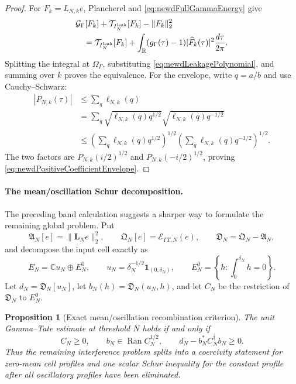 \documentclass[11pt]{amsart}
\newtheorem{proposition}[theorem]{Proposition}
\theoremstyle{definition}
\theoremstyle{remark}
\newcommand{\C}{\mathbb C}
\newcommand{\R}{\mathbb R}
\begin{document}
\begin{proof}
For $F_k=L_{N,k}e$, Plancherel and
\eqref{eq:newdFullGammaEnergy} give
\begin{align*}
 &\mathcal G_\Gamma[F_k]+\mathcal T_{I_N^{\rm leak}}[F_k]-\|F_k\|_2^2\\
 &\quad=\mathcal T_{I_N^{\rm leak}}[F_k]
 +\int_\R(g_\Gamma(\tau)-1)|\widehat F_k(\tau)|^2
          \frac{d\tau}{2\pi}.
\end{align*}
Splitting the integral at $\Omega_\Gamma$, substituting
\eqref{eq:newdLeakagePolynomial}, and summing over $k$ proves the
equivalence.  For the envelope, write $q=a/b$ and use Cauchy--Schwarz:
\begin{align*}
 |P_{N,k}(\tau)|
 &\leq\sum_q\ell_{N,k}(q)\\
 &=\sum_q
   \sqrt{\ell_{N,k}(q)q^{1/2}}
   \sqrt{\ell_{N,k}(q)q^{-1/2}}\\
 &\leq
 \left(\sum_q\ell_{N,k}(q)q^{1/2}\right)^{1/2}
 \left(\sum_q\ell_{N,k}(q)q^{-1/2}\right)^{1/2}.
\end{align*}
The two factors are $P_{N,k}(i/2)^{1/2}$ and
$P_{N,k}(-i/2)^{1/2}$, proving
\eqref{eq:newdPositiveCoefficientEnvelope}.
\end{proof}

\paragraph{The mean/oscillation Schur decomposition.}
The preceding band calculation suggests a sharper way to formulate the
remaining global problem.  Put
\[
 \mathfrak A_N[e]=\|\mathbf L_Ne\|_2^2,
 \qquad
 \mathfrak Q_N[e]=\mathcal E_{\Gamma T,N}(e),
 \qquad
 \mathfrak D_N=\mathfrak Q_N-\mathfrak A_N,
\]
and decompose the input cell exactly as
\begin{equation}\label{eq:newdMeanZeroSplit}
 E_N=\C u_N\oplus E_N^0,
 \qquad
 u_N=\delta_N^{-1/2}\mathbf1_{(0,\delta_N)},
 \qquad
 E_N^0=\left\{h:\int_0^{\delta_N}h=0\right\}.
\end{equation}
Let $d_N=\mathfrak D_N[u_N]$, let
$b_N(h)=\mathfrak D_N(u_N,h)$, and let $C_N$ be the restriction of
$\mathfrak D_N$ to $E_N^0$.

\begin{proposition}[Exact mean/oscillation recombination criterion]
\label{prop:newdMeanZeroSchur}
The unit Gamma--Tate estimate at threshold $N$ holds if and only if
\begin{equation}\label{eq:newdMeanZeroSchurCriterion}
 C_N\geq0,
 \qquad
 b_N\in\operatorname{Ran}C_N^{1/2},
 \qquad
 d_N-b_N^*C_N^\dagger b_N\geq0.
\end{equation}
Thus the remaining interference problem splits into a coercivity statement
for zero-mean cell profiles and one scalar Schur inequality for the constant
profile after all oscillatory profiles have been eliminated.
\end{proposition}
\end{document}
